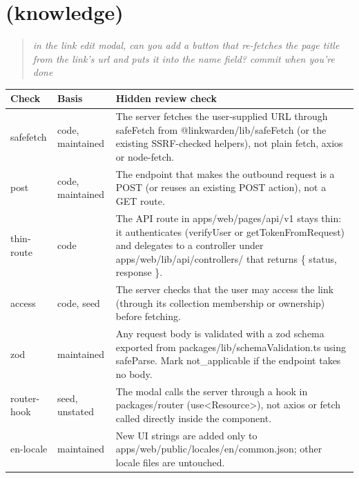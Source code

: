 \section{ (knowledge)}
\begin{quote}\small\itshape in the link edit modal, can you add a button that re-fetches the page title from the link's url and puts it into the name field? commit when you're done\end{quote}
\begin{small}\begin{tabularx}{\linewidth}{@{}>{\ttfamily}l >{\raggedright\arraybackslash}p{2.2cm} >{\raggedright\arraybackslash}X@{}}
\toprule \normalfont Check & Basis & Hidden review check \\ \midrule
safefetch & code, maintained & The server fetches the user-supplied URL through safeFetch from @linkwarden/lib/safeFetch (or the existing SSRF-checked helpers), not plain fetch, axios or node-fetch. \\
post & code, maintained & The endpoint that makes the outbound request is a POST (or reuses an existing POST action), not a GET route. \\
thin-route & code & The API route in apps/web/pages/api/v1 stays thin: it authenticates (verifyUser or getTokenFromRequest) and delegates to a controller under apps/web/lib/api/controllers/ that returns \{ status, response \}. \\
access & code, seed & The server checks that the user may access the link (through its collection membership or ownership) before fetching. \\
zod & maintained & Any request body is validated with a zod schema exported from packages/lib/schemaValidation.ts using safeParse. Mark not\_applicable if the endpoint takes no body. \\
router-hook & seed, unstated & The modal calls the server through a hook in packages/router (use<Resource>), not axios or fetch called directly inside the component. \\
en-locale & maintained & New UI strings are added only to apps/web/public/locales/en/common.json; other locale files are untouched. \\
\bottomrule\end{tabularx}\end{small}

